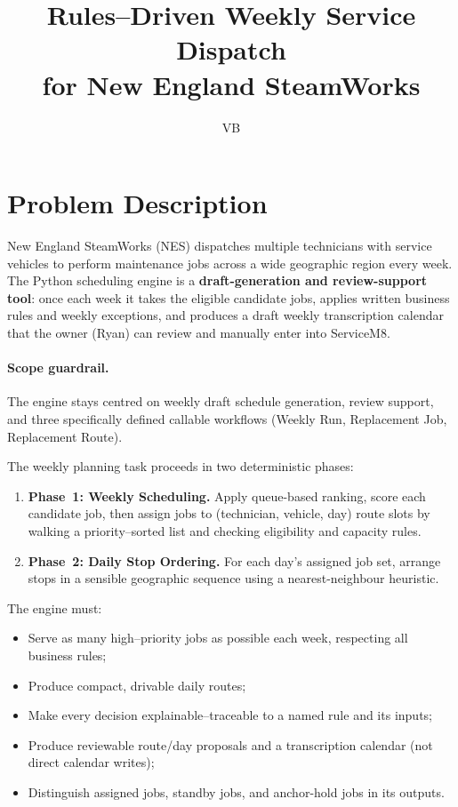 \documentclass[12pt]{article}
\title{Rules--Driven Weekly Service Dispatch\\for New England SteamWorks}
\author{VB}
\date{}
\begin{document}
\maketitle

\section*{Problem Description}

New England SteamWorks (NES) dispatches multiple technicians with service vehicles to perform maintenance jobs across a wide geographic region every week.
The Python scheduling engine is a \textbf{draft-generation and review-support tool}: once each week it takes the eligible candidate jobs, applies written business rules and weekly exceptions, and produces a draft weekly transcription calendar that the owner (Ryan) can review and manually enter into ServiceM8.

\paragraph{Scope guardrail.}
The engine stays centred on weekly draft schedule generation, review support, and three specifically defined callable workflows (Weekly Run, Replacement Job, Replacement Route).

The weekly planning task proceeds in two deterministic phases:
\begin{enumerate}
    \item \textbf{Phase~1: Weekly Scheduling.} Apply queue-based ranking, score each candidate job, then assign jobs to (technician, vehicle, day) route slots by walking a priority--sorted list and checking eligibility and capacity rules.
    \item \textbf{Phase~2: Daily Stop Ordering.} For each day's assigned job set, arrange stops in a sensible geographic sequence using a nearest-neighbour heuristic.
\end{enumerate}

The engine must:
\begin{itemize}
    \item Serve as many high--priority jobs as possible each week, respecting all business rules;
    \item Produce compact, drivable daily routes;
    \item Make every decision explainable--traceable to a named rule and its inputs;
    \item Produce reviewable route/day proposals and a transcription calendar (not direct calendar writes);
    \item Distinguish assigned jobs, standby jobs, and anchor-hold jobs in its outputs.
\end{itemize}
\end{document}
